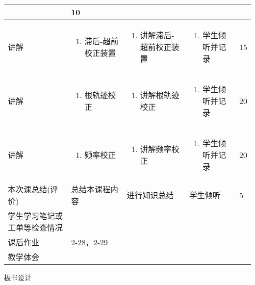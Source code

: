 {\begin{landscape}
\begin{longtable}{|m{10mm}|m{50mm}|m{50mm}|m{50mm}|m{15mm}|}
\begin{enumerate}
\end{enumerate} &10 \\\hline
讲解&\begin{enumerate}
\item 滞后-超前校正装置
\end{enumerate}
&\begin{enumerate}
\item 讲解滞后-超前校正装置
\end{enumerate} &\begin{enumerate}
\item 学生倾听并记录
\end{enumerate} &15 \\\hline
讲解&\begin{enumerate}
\item 根轨迹校正
\end{enumerate}
&\begin{enumerate}
\item 讲解根轨迹校正
\end{enumerate} &\begin{enumerate}
\item 学生倾听并记录
\end{enumerate} &20 \\\hline
讲解&\begin{enumerate}
\item 频率校正
\end{enumerate}
&\begin{enumerate}
\item 讲解频率校正
\end{enumerate} &\begin{enumerate}
\item 学生倾听并记录
\end{enumerate} &20 \\\hline
\centering 本次课总结(评价)&总结本课程内容 &进行知识总结 &学生倾听 &5 \\\hline
\centering 学生学习笔记或工单等检查情况&\multicolumn{4}{m{165mm}|}{\quad}\\\hline
\centering 课后作业&\multicolumn{4}{m{165mm}|}{2-28，2-29}\\\hline
\centering 教学体会&\multicolumn{4}{m{165mm}|}{\quad}\\
\end{longtable}

\end{landscape}
\clearpage
\begin{center}
{\huge 板书设计}
\end{center}
}

